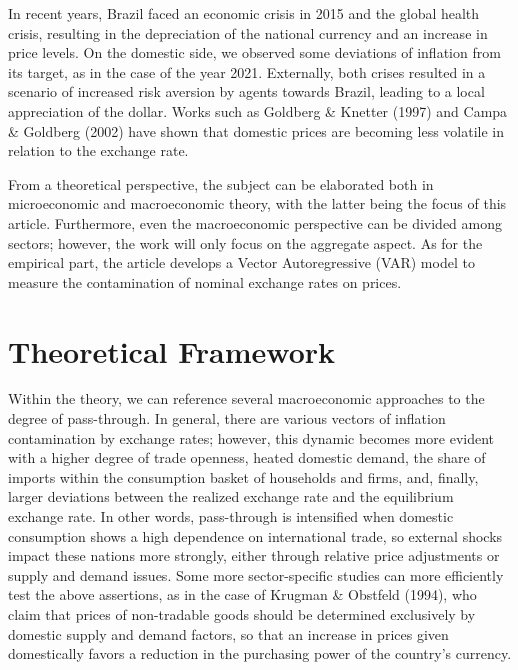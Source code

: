 \documentclass[12pt]{article}
\begin{document}
In recent years, Brazil faced an economic crisis in 2015 and the global
health crisis, resulting in the depreciation of the national currency
and an increase in price levels. On the domestic side, we observed some
deviations of inflation from its target, as in the case of the year
2021. Externally, both crises resulted in a scenario of increased risk
aversion by agents towards Brazil, leading to a local appreciation of
the dollar. Works such as Goldberg \& Knetter (1997) and Campa \&
Goldberg (2002) have shown that domestic prices are becoming less
volatile in relation to the exchange rate.

From a theoretical perspective, the subject can be elaborated both in
microeconomic and macroeconomic theory, with the latter being the focus
of this article. Furthermore, even the macroeconomic perspective can be
divided among sectors; however, the work will only focus on the
aggregate aspect. As for the empirical part, the article develops a
Vector Autoregressive (VAR) model to measure the contamination of
nominal exchange rates on prices.

\hypertarget{theoretical-framework}{%
\section{Theoretical Framework}\label{theoretical-framework}}

Within the theory, we can reference several macroeconomic approaches to
the degree of pass-through. In general, there are various vectors of
inflation contamination by exchange rates; however, this dynamic becomes
more evident with a higher degree of trade openness, heated domestic
demand, the share of imports within the consumption basket of households
and firms, and, finally, larger deviations between the realized exchange
rate and the equilibrium exchange rate. In other words, pass-through is
intensified when domestic consumption shows a high dependence on
international trade, so external shocks impact these nations more
strongly, either through relative price adjustments or supply and demand
issues. Some more sector-specific studies can more efficiently test the
above assertions, as in the case of Krugman \& Obstfeld (1994), who
claim that prices of non-tradable goods should be determined exclusively
by domestic supply and demand factors, so that an increase in prices
given domestically favors a reduction in the purchasing power of the
country's currency.
\end{document}
